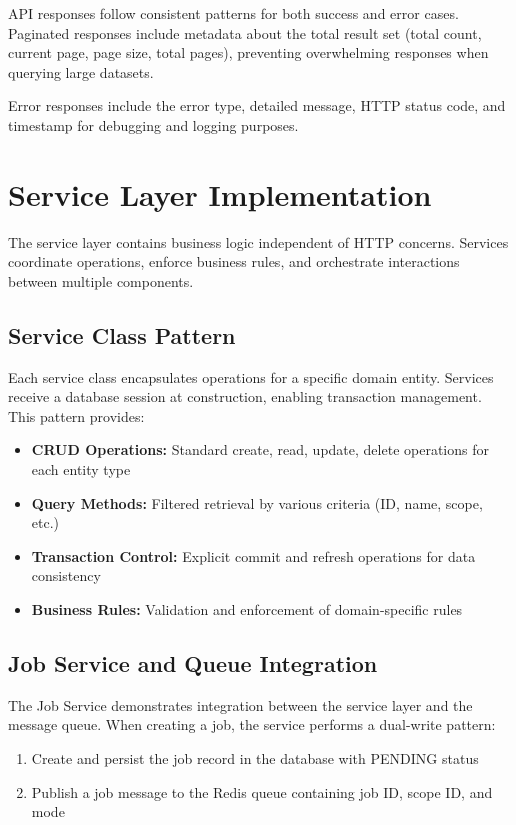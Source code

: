 \documentclass[a4paper,12pt]{report}
\begin{document}
API responses follow consistent patterns for both success and error cases. Paginated responses include metadata about the total result set (total count, current page, page size, total pages), preventing overwhelming responses when querying large datasets.\hfill \break

Error responses include the error type, detailed message, HTTP status code, and timestamp for debugging and logging purposes.\hfill \break

\section{Service Layer Implementation}

The service layer contains business logic independent of HTTP concerns. Services coordinate operations, enforce business rules, and orchestrate interactions between multiple components.

\subsection{Service Class Pattern}

Each service class encapsulates operations for a specific domain entity. Services receive a database session at construction, enabling transaction management. This pattern provides:

\begin{itemize}
\item \textbf{CRUD Operations:} Standard create, read, update, delete operations for each entity type
\item \textbf{Query Methods:} Filtered retrieval by various criteria (ID, name, scope, etc.)
\item \textbf{Transaction Control:} Explicit commit and refresh operations for data consistency
\item \textbf{Business Rules:} Validation and enforcement of domain-specific rules
\end{itemize}

\subsection{Job Service and Queue Integration}

The Job Service demonstrates integration between the service layer and the message queue. When creating a job, the service performs a dual-write pattern:

\begin{enumerate}
\item Create and persist the job record in the database with PENDING status
\item Publish a job message to the Redis queue containing job ID, scope ID, and mode
\end{enumerate}
\end{document}
